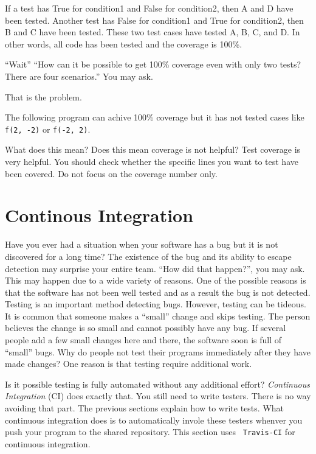 {If a test has True for condition1 and False for condition2, then A and
D have been tested. Another test has False for condition1 and True for
condition2, then B and C have been tested.  These two test cases have
tested A, B, C, and D. In other words, all code has been tested and
the coverage is 100\%.

``Wait'' ``How can it be possible to get 100\% coverage even with only
two tests? There are four scenarios.'' You may ask.

That is the problem.

The following program can achive 100\% coverage but it has not tested
cases like {\tt f(2, -2)} or {\tt f(-2, 2)}.

\resetlinenumber[1]
\linenumbers
\begin{tt}
  
\end{tt}
\nolinenumbers

What does this mean? Does this mean coverage is not helpful? Test
coverage is very helpful.  You should check whether the specific lines
you want to test have been covered.  Do not focus on the coverage
number only.



\section{Continous Integration}

Have you ever had a situation when your software has a bug but it is
not discovered for a long time?  The existence of the bug and its
ability to escape detection may surprise your entire team. ``How did
that happen?'', you may ask.  This may happen due to a wide variety of
reasons. One of the possible reasons is that the software has not been
well tested and as a result the bug is not detected. Testing is an
important method detecting bugs.  However, testing can be tideous.  It
is common that someone makes a ``small'' change and skips testing.
The person believes the change is so small and cannot possibly have
any bug.  If several people add a few small changes here and there,
the software soon is full of ``small'' bugs.  Why do people not test
their programs immediately after they have made changes?  One reason
is that testing require additional work.

Is it possible testing is fully automated without any additional
effort? {\it Continuous Integration} (CI) does exactly that.  You
still need to write testers. There is no way avoiding that part.  The
previous sections explain how to write tests.  What continuous
integration does is to automatically invole these testers whenver you
push your program to the shared repository.  This section uses {\tt
  Travis-CI} for continuous integration. 


}
